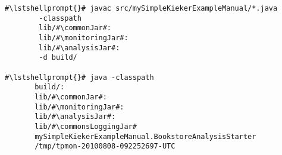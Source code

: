 \begin{lstlisting}[caption=Compile and run under Linux] 			
#\lstshellprompt{}# javac src/mySimpleKiekerExampleManual/*.java
        -classpath	
        lib/#\commonJar#:
        lib/#\monitoringJar#:
        lib/#\analysisJar#:
        -d build/

#\lstshellprompt{}# java -classpath
       build/:
       lib/#\commonJar#:
       lib/#\monitoringJar#:
       lib/#\analysisJar#:
       lib/#\commonsLoggingJar#
       mySimpleKiekerExampleManual.BookstoreAnalysisStarter 
       /tmp/tpmon-20100808-092252697-UTC
\end{lstlisting}	
